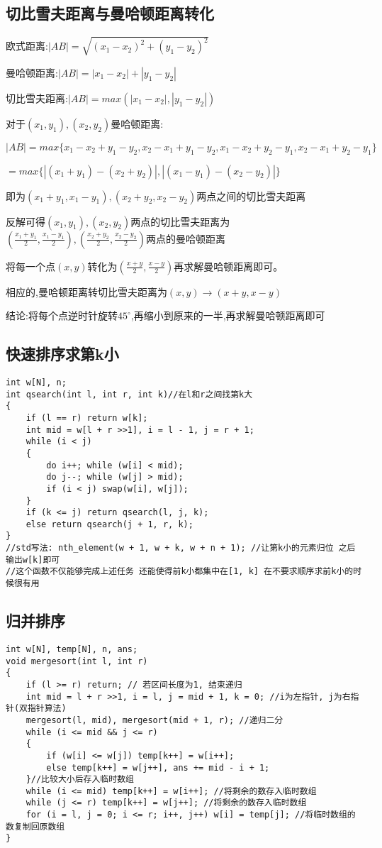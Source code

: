 \documentclass[a4paper, fontset=none]{ctexart}
\begin{document}
\subsection{切比雪夫距离与曼哈顿距离转化}

欧式距离:$|AB|=\sqrt{(x_1-x_2)^2+(y_1-y_2)^2}$

曼哈顿距离:$|AB|=|x_1-x_2|+|y_1-y_2|$

切比雪夫距离:$|AB |= max(|x_1-x_2|,|y_1-y_2|)$

对于$(x_1, y_1),(x_2, y_2)$曼哈顿距离:

$|AB |= max\{x_1-x_2+y_1-y_2, x_2-x_1+y_1-y_2, x_1-x_2+y_2-y_1, x_2-x_1+y_2-y_1\}$

$=max\{|(x_1+y_1)-(x_2+y_2)|,|(x_1-y_1)-(x_2-y_2)|\}$

即为$(x_1+y_1, x_1-y_1),(x_2+y_2, x_2-y_2)$两点之间的切比雪夫距离

反解可得$(x_1, y_1),(x_2, y_2)$两点的切比雪夫距离为$(\frac{x_1+y_1}{2},\frac{x_1-y_1}{2}),(\frac{x_2+y_2}{2},\frac{x_2-y_2}{2})$两点的曼哈顿距离

将每一个点$(x, y)$转化为$(\frac{x+y}{2},\frac{x-y}{2})$再求解曼哈顿距离即可。

相应的,曼哈顿距离转切比雪夫距离为$(x, y)\rightarrow (x+y, x-y)$

结论:将每个点逆时针旋转$45^\circ$,再缩小到原来的一半,再求解曼哈顿距离即可
\subsection{快速排序求第k小}

\begin{verbatim}
int w[N], n;
int qsearch(int l, int r, int k)//在l和r之间找第k大
{
    if (l == r) return w[k];
    int mid = w[l + r >>1], i = l - 1, j = r + 1;
    while (i < j)
    {
        do i++; while (w[i] < mid);
        do j--; while (w[j] > mid);
        if (i < j) swap(w[i], w[j]);
    }
    if (k <= j) return qsearch(l, j, k);
    else return qsearch(j + 1, r, k);
}
//std写法: nth_element(w + 1, w + k, w + n + 1); //让第k小的元素归位 之后输出w[k]即可
//这个函数不仅能够完成上述任务 还能使得前k小都集中在[1, k] 在不要求顺序求前k小的时候很有用
\end{verbatim}
\subsection{归并排序}

\begin{verbatim}
int w[N], temp[N], n, ans;
void mergesort(int l, int r)
{
    if (l >= r) return; // 若区间长度为1, 结束递归
    int mid = l + r >>1, i = l, j = mid + 1, k = 0; //i为左指针, j为右指针(双指针算法)
    mergesort(l, mid), mergesort(mid + 1, r); //递归二分
    while (i <= mid && j <= r)
    {
        if (w[i] <= w[j]) temp[k++] = w[i++];
        else temp[k++] = w[j++], ans += mid - i + 1;
    }//比较大小后存入临时数组
    while (i <= mid) temp[k++] = w[i++]; //将剩余的数存入临时数组
    while (j <= r) temp[k++] = w[j++]; //将剩余的数存入临时数组
    for (i = l, j = 0; i <= r; i++, j++) w[i] = temp[j]; //将临时数组的数复制回原数组
}
\end{verbatim}
\end{document}
